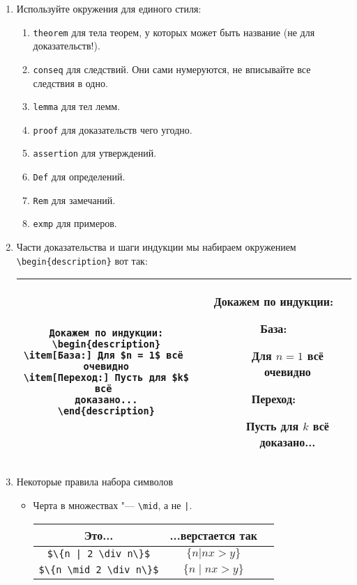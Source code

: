 \begin{enumerate}
\item 
	Используйте окружения для единого стиля:
	\begin{enumerate}
		\item \verb'theorem' для тела теорем, у которых может быть название (не для доказательств!).
		\item \verb'conseq' для следствий. Они сами нумеруются, не вписывайте все следствия в одно.
		\item \verb'lemma' для тел лемм.
		\item \verb'proof' для доказательств чего угодно.
		\item \verb'assertion' для утверждений.
		\item \verb'Def' для определений.
		\item \verb'Rem' для замечаний.
		\item \verb'exmp' для примеров.
	\end{enumerate}

\item 
	Части доказательства и шаги индукции мы набираем окружением \verb'\begin{description}' вот так:
	\begin{center}\begin{tabular}{|c|c|}
		\hline
		\begin{minipage}{8cm}
\begin{verbatim}
Докажем по индукции:
\begin{description}
\item[База:] Для $n = 1$ всё 
очевидно
\item[Переход:] Пусть для $k$ всё 
доказано...
\end{description}
\end{verbatim}
		\end{minipage}
		&
		\begin{minipage}{7cm}
			Докажем по индукции:
			\begin{description}
				\item[База:] Для $n = 1$ всё очевидно
				\item[Переход:] Пусть для $k$ всё доказано...
			\end{description}
		\end{minipage} \\
		\hline
	\end{tabular}\end{center}

\item
	Некоторые правила набора символов
	\begin{itemize}
	\item 
		Черта в множествах "--- \verb'\mid', а не \verb'|'.
		\begin{center}\begin{tabular}{|c|c|c|}
			\hline Это... & ...верстается так & \\
			\hline \verb'$\{n | 2 \div n\}$' & $\{n | nx > y\}$ \bad \\
			\hline \verb'$\{n \mid 2 \div n\}$' & $\{n \mid nx > y\}$ \ok \\
			\hline
		\end{tabular}\end{center}
	

\end{itemize}
\end{enumerate}
